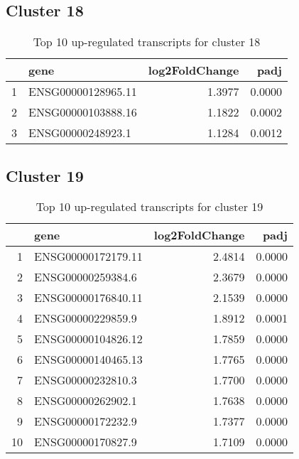\documentclass{article}
\begin{document}
\subsection{Cluster 18 }
\begin{table}[H]
\centering
\begin{tabular}{rlrr}
  \hline
 & gene & log2FoldChange & padj \\ 
  \hline
1 & ENSG00000128965.11 & 1.3977 & 0.0000 \\ 
  2 & ENSG00000103888.16 & 1.1822 & 0.0002 \\ 
  3 & ENSG00000248923.1 & 1.1284 & 0.0012 \\ 
   \hline
\end{tabular}
\caption{Top 10 up-regulated transcripts for cluster 18} 
\label{tab:q3_1_18}
\end{table}
\subsection{Cluster 19 }
\begin{table}[H]
\centering
\begin{tabular}{rlrr}
  \hline
 & gene & log2FoldChange & padj \\ 
  \hline
1 & ENSG00000172179.11 & 2.4814 & 0.0000 \\ 
  2 & ENSG00000259384.6 & 2.3679 & 0.0000 \\ 
  3 & ENSG00000176840.11 & 2.1539 & 0.0000 \\ 
  4 & ENSG00000229859.9 & 1.8912 & 0.0001 \\ 
  5 & ENSG00000104826.12 & 1.7859 & 0.0000 \\ 
  6 & ENSG00000140465.13 & 1.7765 & 0.0000 \\ 
  7 & ENSG00000232810.3 & 1.7700 & 0.0000 \\ 
  8 & ENSG00000262902.1 & 1.7638 & 0.0000 \\ 
  9 & ENSG00000172232.9 & 1.7377 & 0.0000 \\ 
  10 & ENSG00000170827.9 & 1.7109 & 0.0000 \\ 
   \hline
\end{tabular}
\caption{Top 10 up-regulated transcripts for cluster 19} 
\label{tab:q3_1_19}
\end{table}
\end{document}
